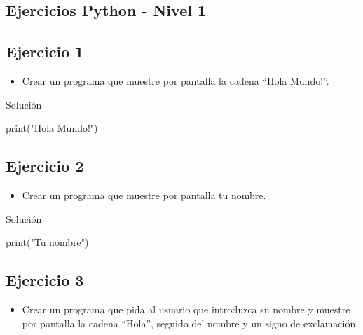 \documentclass[
  a4paper,
  DIV=11,
  numbers=noendperiod,
  onepage,
  openany]{scrreprt}
\newenvironment{Shaded}{\begin{snugshade}}{\end{snugshade}}
\newcommand{\BuiltInTok}[1]{\textcolor[rgb]{0.00,0.23,0.31}{#1}}
\newcommand{\NormalTok}[1]{\textcolor[rgb]{0.00,0.23,0.31}{#1}}
\newcommand{\StringTok}[1]{\textcolor[rgb]{0.13,0.47,0.30}{#1}}
\providecommand{\tightlist}{%
  \setlength{\itemsep}{0pt}\setlength{\parskip}{0pt}}\usepackage{longtable,booktabs,array}
\begin{document}
\begin{tcolorbox}
\chapter{Ejercicios Python - Nivel 1}\label{ejercicios-python---nivel-1}

\section{Ejercicio 1}\label{ejercicio-1-2}

\begin{itemize}
\tightlist
\item
  Crear un programa que muestre por pantalla la cadena ``Hola Mundo!''.
\end{itemize}

Solución

\begin{Shaded}
\begin{Highlighting}[]
\BuiltInTok{print}\NormalTok{(}\StringTok{"Hola Mundo!"}\NormalTok{)}
\end{Highlighting}
\end{Shaded}

\section{Ejercicio 2}\label{ejercicio-2-1}

\begin{itemize}
\tightlist
\item
  Crear un programa que muestre por pantalla tu nombre.
\end{itemize}

Solución

\begin{Shaded}
\begin{Highlighting}[]
\BuiltInTok{print}\NormalTok{(}\StringTok{"Tu nombre"}\NormalTok{)}
\end{Highlighting}
\end{Shaded}

\section{Ejercicio 3}\label{ejercicio-3-1}

\begin{itemize}
\tightlist
\item
  Crear un programa que pida al usuario que introduzca su nombre y
  muestre por pantalla la cadena ``Hola'', seguido del nombre y un signo
  de exclamación.
\end{itemize}


\end{tcolorbox}
\end{document}
